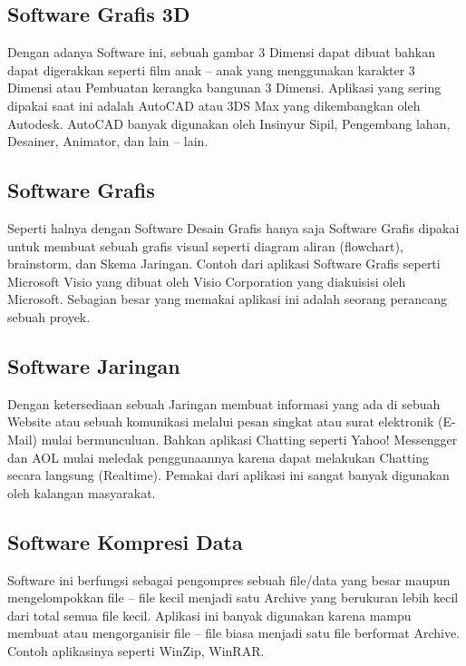 \subsection{Software Grafis 3D}
\begin{flushleft}
Dengan adanya Software ini, sebuah gambar 3 Dimensi dapat dibuat bahkan dapat digerakkan seperti film anak – anak yang menggunakan karakter 3 Dimensi atau Pembuatan kerangka bangunan 3 Dimensi. Aplikasi yang sering dipakai saat ini adalah AutoCAD atau 3DS Max yang dikembangkan oleh Autodesk. AutoCAD banyak digunakan oleh Insinyur Sipil, Pengembang lahan, Desainer, Animator, dan lain – lain. 
\end{flushleft}
\subsection{Software Grafis}
\begin{flushleft}
Seperti halnya dengan Software Desain Grafis hanya saja Software Grafis dipakai untuk membuat sebuah grafis visual seperti diagram aliran (flowchart), brainstorm, dan Skema Jaringan. Contoh dari aplikasi Software Grafis seperti Microsoft Visio yang dibuat oleh Visio Corporation yang diakuisisi oleh Microsoft. Sebagian besar yang memakai aplikasi ini adalah seorang perancang sebuah proyek. 
\end{flushleft}
\subsection{Software Jaringan}
\begin{flushleft}
Dengan ketersediaan sebuah Jaringan membuat informasi yang ada di sebuah Website atau sebuah komunikasi melalui pesan singkat atau surat elektronik (E-Mail) mulai bermunculuan. Bahkan aplikasi Chatting seperti Yahoo! Messengger dan AOL mulai meledak penggunaannya karena dapat melakukan Chatting secara langsung (Realtime). Pemakai dari aplikasi ini sangat banyak digunakan oleh kalangan masyarakat.
\end{flushleft}
\subsection{Software Kompresi Data}
\begin{flushleft}
Software ini berfungsi sebagai pengompres sebuah file/data yang besar maupun mengelompokkan file – file kecil menjadi satu Archive yang berukuran lebih kecil dari total semua file kecil. Aplikasi ini banyak digunakan karena mampu membuat atau mengorganisir file – file biasa menjadi satu file berformat Archive. Contoh aplikasinya seperti WinZip, WinRAR.
\end{flushleft}
